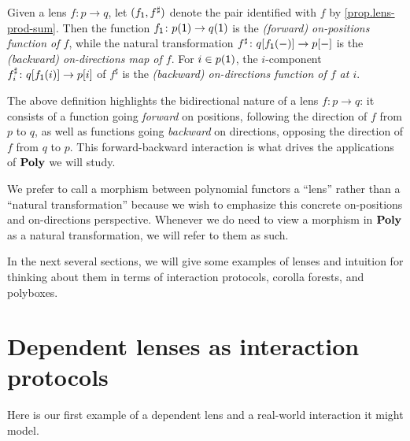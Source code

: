 \documentclass[Book-Poly]{subfiles}
\begin{document}
\begin{definition}
  Given a lens $f\colon p\to q$, let $(f_{\textsf{1}}, f^\sharp)$ denote the pair identified with $f$ by \cref{prop.lens-prod-sum}.
  Then the function $f_{\textsf{1}}\colon p(\textsf{1})\to q(\textsf{1})$ is the \emph{(forward) on-positions function of $f$}, while the natural transformation $f^\sharp\colon q[f_{\textsf{1}}(-)]\to p[-]$ is the \emph{(backward) on-directions map of $f$}.
  For $i\in p(\textsf{1})$, the $i$-component $f^\sharp_i\colon q[f_{\textsf{1}}(i)]\to p[i]$ of $f^\sharp$ is the \emph{(backward) on-directions function of $f$ at $i$}.
\end{definition}

The above definition highlights the bidirectional nature of a lens $f\colon p\to q$: it consists of a function going \textit{forward} on positions, following the direction of $f$ from $p$ to $q$, as well as functions going \textit{backward} on directions, opposing the direction of $f$ from $q$ to $p$.
This forward-backward interaction is what drives the applications of $\mathbf{Poly}$ we will study.

We prefer to call a morphism between polynomial functors a ``lens'' rather than a ``natural transformation'' because we wish to emphasize this concrete on-positions and on-directions perspective.
Whenever we do need to view a morphism in $\mathbf{Poly}$ as a natural transformation, we will refer to them as such.

In the next several sections, we will give some examples of lenses and intuition for thinking about them in terms of interaction protocols, corolla forests, and polyboxes.

\section{Dependent lenses as interaction protocols}

Here is our first example of a dependent lens and a real-world interaction it might model.
\end{document}
